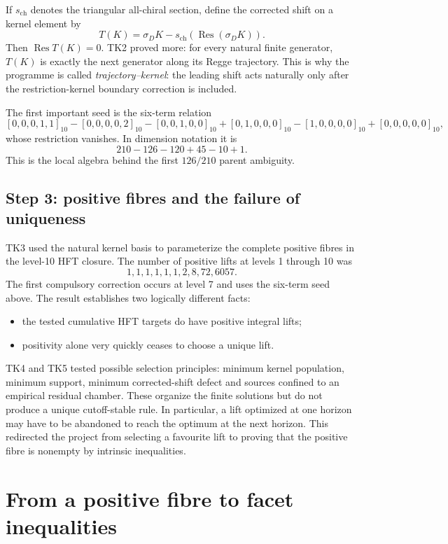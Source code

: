 \documentclass[11pt,a4paper]{article}
\theoremstyle{definition}
\newcommand{\Res}{\operatorname{Res}}
\begin{document}
If $s_{\mathrm{ch}}$ denotes the triangular all-chiral section, define the
corrected shift on a kernel element by
\begin{equation}
\label{eq:corrected-kernel-shift}
   T(K)=\sigma_DK-s_{\mathrm{ch}}(\Res(\sigma_DK)).
\end{equation}
Then $\Res T(K)=0$.  TK2 proved more: for every natural finite generator,
$T(K)$ is exactly the next generator along its Regge trajectory.  This is
why the programme is called \emph{trajectory--kernel}: the leading shift acts
naturally only after the restriction-kernel boundary correction is included.

The first important seed is the six-term relation
\[
 [0,0,0,1,1]_{10}-[0,0,0,0,2]_{10}
 -[0,0,1,0,0]_{10}+[0,1,0,0,0]_{10}
 -[1,0,0,0,0]_{10}+[0,0,0,0,0]_{10},
\]
whose restriction vanishes.  In dimension notation it is
\[
   210-126-120+45-10+1.
\]
This is the local algebra behind the first $126/210$ parent ambiguity.

\subsection{Step 3: positive fibres and the failure of uniqueness}

TK3 used the natural kernel basis to parameterize the complete positive
fibres in the level-10 HFT closure.  The number of positive lifts at levels
1 through 10 was
\[
   1,1,1,1,1,1,2,8,72,6057.
\]
The first compulsory correction occurs at level 7 and uses the six-term seed
above.  The result establishes two logically different facts:
\begin{itemize}
  \item the tested cumulative HFT targets do have positive integral lifts;
  \item positivity alone very quickly ceases to choose a unique lift.
\end{itemize}

TK4 and TK5 tested possible selection principles: minimum kernel population,
minimum support, minimum corrected-shift defect and sources confined to an
empirical residual chamber.  These organize the finite solutions but do not
produce a unique cutoff-stable rule.  In particular, a lift optimized at one
horizon may have to be abandoned to reach the optimum at the next horizon.
This redirected the project from selecting a favourite lift to proving that
the positive fibre is nonempty by intrinsic inequalities.

\section{From a positive fibre to facet inequalities}
\end{document}

